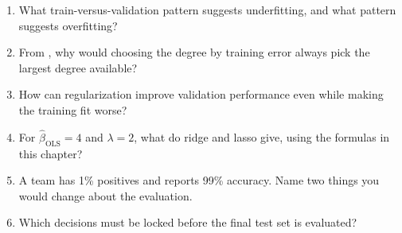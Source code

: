 \begin{quickcheck}
\begin{enumerate}
  \item What train-versus-validation pattern suggests underfitting, and what pattern suggests overfitting?
  \item From , why would choosing the degree by training error always pick the largest degree available?
  \item How can regularization improve validation performance even while making the training fit worse?
  \item For $\hat\beta_{\text{OLS}}=4$ and $\lambda=2$, what do ridge and lasso give, using the formulas in this chapter?
  \item A team has 1\% positives and reports 99\% accuracy. Name two things you would change about the evaluation.
  \item Which decisions must be locked before the final test set is evaluated?
\end{enumerate}
\end{quickcheck}

